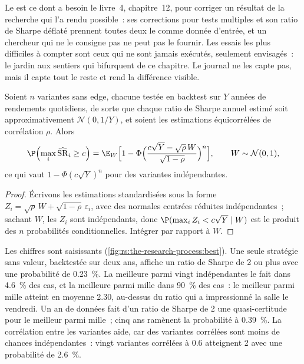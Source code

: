 Le  est ce dont a besoin le livre~4, chapitre~12, pour corriger un résultat de la recherche qui l'a rendu possible~: ses corrections pour tests
multiples et son ratio de Sharpe déflaté prennent toutes deux le  comme donnée d'entrée, et un chercheur qui ne le consigne pas
ne peut pas le fournir. Les essais les plus difficiles à compter sont ceux qui ne sont jamais exécutés, seulement envisagés~: le jardin aux sentiers qui bifurquent
de ce chapitre. Le journal ne les capte pas, mais il capte tout le reste et rend la différence visible.

\begin{proposition}\label{prop:rs:the-research-process:best}
Soient $n$ variantes sans edge, chacune testée en backtest sur $Y$ années de rendements quotidiens, de sorte que chaque ratio de Sharpe annuel estimé soit
approximativement $\mathcal N(0, 1/Y)$, et soient les estimations équicorrélées de corrélation $\rho$. Alors
\[
\P\Bigl(\max_i \widehat{\mathrm{SR}}_i \ge c\Bigr) = \E_W\Bigl[1 - \Phi\Bigl(\frac{c\sqrt Y - \sqrt\rho\,W}{\sqrt{1 - \rho}}\Bigr)^n\Bigr],
\qquad W \sim \mathcal N(0, 1),
\]
ce qui vaut $1 - \Phi(c\sqrt Y)^n$ pour des variantes indépendantes.
\end{proposition}

\begin{proof}
Écrivons les estimations standardisées sous la forme $Z_i = \sqrt\rho\,W + \sqrt{1 - \rho}\,\varepsilon_i$, avec des normales centrées réduites indépendantes~; sachant
$W$, les $Z_i$ sont indépendants, donc $\P(\max_i Z_i < c\sqrt Y \mid W)$ est le produit des $n$ probabilités conditionnelles.
Intégrer par rapport à $W$.
\end{proof}

Les chiffres sont saisissants (\cref{fig:rs:the-research-process:best}). Une seule stratégie sans valeur, backtestée sur deux ans, affiche
un ratio de Sharpe de 2 ou plus avec une probabilité de 0.23~\%. La meilleure parmi vingt indépendantes le fait dans 4.6~\% des cas, et la
meilleure parmi mille dans 90~\% des cas~: le meilleur parmi mille atteint en moyenne 2.30, au-dessus du ratio qui a impressionné la salle
le vendredi. Un an de données fait d'un ratio de Sharpe de 2 une quasi-certitude pour le meilleur parmi mille~; cinq ans ramènent la
probabilité à 0.39~\%. La corrélation entre les variantes aide, car des variantes corrélées sont moins de chances indépendantes~: vingt variantes
corrélées à 0.6 atteignent 2 avec une probabilité de 2.6~\%.

